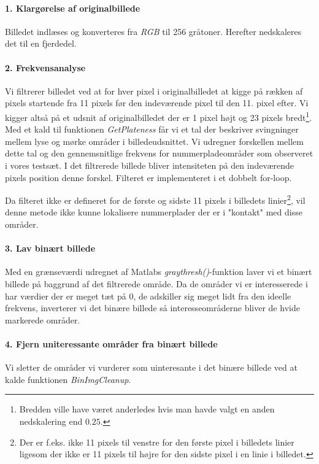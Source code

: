 \paragraph{1. Klargørelse af originalbillede}
Billedet indlæses og konverteres fra \textit{RGB} til 256 gråtoner. Herefter nedskaleres det til en fjerdedel.

\paragraph{2. Frekvensanalyse}
Vi filtrerer billedet ved at for hver pixel i originalbilledet at kigge på rækken af pixels startende fra 11 pixels før den indeværende pixel til den 11. pixel efter. Vi kigger altså på et udsnit af originalbilledet der er 1 pixel højt og 23 pixels bredt\footnote{Bredden ville have været anderledes hvis man havde valgt en anden nedskalering end $0.25$.}. Med et kald til funktionen \textit{GetPlateness} får vi et tal der beskriver svingninger mellem lyse og mørke områder i billedeudsnittet. Vi udregner forskellen mellem dette tal og den gennemsnitlige frekvens for nummerpladeområder som observeret i vores testsæt. I det filtrerede billede bliver intensiteten på den indeværende pixels position denne forskel. Filteret er implementeret i et dobbelt for-loop.

Da filteret ikke er defineret for de første og sidste 11 pixels i billedets linier\footnote{Der er f.eks. ikke 11 pixels til venstre for den første pixel i billedets linier ligesom der ikke er 11 pixels til højre for den sidste pixel i en linie i billedet.}, vil denne metode ikke kunne lokalisere nummerplader der er i "kontakt" med disse områder.

\paragraph{3. Lav binært billede}
Med en grænseværdi udregnet af Matlabs \textit{graythresh()}-funktion laver vi et binært billede på baggrund af det filtrerede område. Da de områder vi er interesserede i har værdier der er meget tæt på 0, de adskiller sig meget lidt fra den ideelle frekvens, inverterer vi det binære billede så interesseområderne bliver de hvide markerede områder. 

\paragraph{4. Fjern uniteressante områder fra binært billede}
Vi sletter de områder vi vurderer som uinteresante i det binære billede ved at kalde funktionen \textit{BinImgCleanup}.

